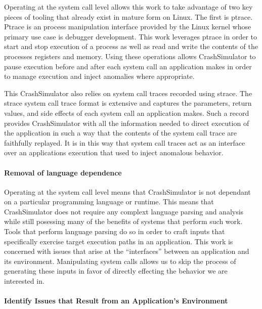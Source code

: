         Operating at the system call level allows this work to take advantage of two key pieces of tooling that already
        exist in mature form on Linux.  The first is ptrace. Ptrace is an process manipulation interface provided by the
        Linux kernel whose primary use case is debugger development.  This work leverages ptrace in order to start and stop
        execution of a process as well as read and write the contents of the processes registers and memory.  Using these
        operations allows CrashSimulator to pause execution before and after each system call an application makes in order
        to manage execution and inject anomalies where appropriate.

        This CrashSimulator also relies on system call traces recorded using strace.  The strace system call trace format is
        extensive and captures the parameters, return values, and side effects of each system call an application makes.
        Such a record provides CrashSimulator with all the information needed to direct execution of the application in such
        a way that the contents of the system call trace are faithfully replayed.  It is in this way that system call traces
        act as an interface over an applications execution that used to inject anomalous behavior.

        \paragraph{Removal of language dependence}

        Operating at the system call level means that CrashSimulator is not dependant on a particular programming
        language or runtime.  This means that CrashSimulator does not require any complext language parsing and analysis
        while still posessing many of the benefits of systems that perform such work.  Tools that perform language
        parsing do so in order to craft inputs that specifically exercise target execution paths in an application.
        This work is concerned with issues that arise at the ``interfaces'' between an application and its environment.
        Manipulating system calls allows us to skip the process of generating these inputs in favor of directly
        effecting the behavior we are interested in.

        \paragraph{Identify Issues that Result from an Application's Environment}

